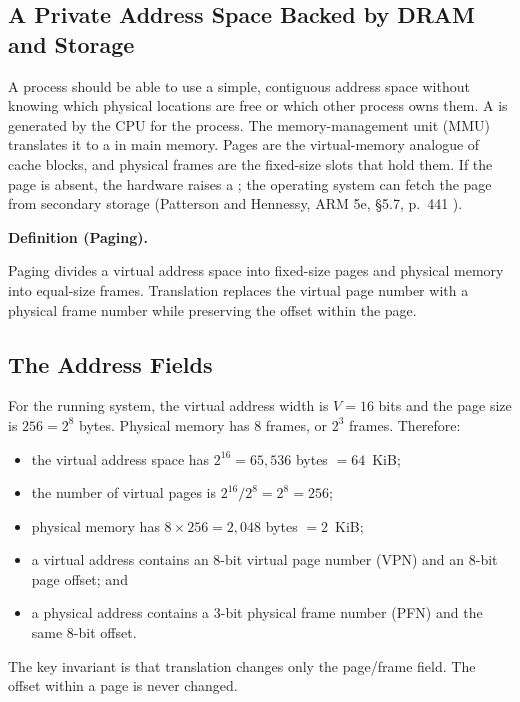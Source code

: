 \documentclass[11pt]{article}
\newenvironment{definitionbox}[1]{%
  \par\noindent\textbf{Definition (#1).}\ \itshape
}{\par\vspace{0.3em}}
\begin{document}
\subsection{A Private Address Space Backed by DRAM and Storage}

A process should be able to use a simple, contiguous address space without
knowing which physical locations are free or which other process owns them. A
 is generated by the CPU for the process. The
memory-management unit (MMU) translates it to a  in
main memory. Pages are the virtual-memory analogue of cache blocks, and
physical frames are the fixed-size slots that hold them. If the page is absent,
the hardware raises a ; the operating system can fetch the
page from secondary storage (Patterson and Hennessy, ARM 5e, \S5.7, p.~441
\cite[\S5.7, p.~441]{PattersonHennessy2017_computer_organization_design}).

\begin{definitionbox}{Paging}
Paging divides a virtual address space into fixed-size pages and physical
memory into equal-size frames. Translation replaces the virtual page number
with a physical frame number while preserving the offset within the page.
\end{definitionbox}

\subsection{The Address Fields}

For the running system, the virtual address width is $V=16$ bits and the page
size is $256=2^8$ bytes. Physical memory has 8 frames, or $2^3$ frames.
Therefore:
\begin{itemize}
  \item the virtual address space has $2^{16}=65{,}536$ bytes $=64$~KiB;
  \item the number of virtual pages is $2^{16}/2^8=2^8=256$;
  \item physical memory has $8\times256=2{,}048$ bytes $=2$~KiB;
  \item a virtual address contains an 8-bit virtual page number (VPN) and an
        8-bit page offset; and
  \item a physical address contains a 3-bit physical frame number (PFN) and
        the same 8-bit offset.
\end{itemize}

The key invariant is that translation changes only the page/frame field. The
offset within a page is never changed.
\end{document}
